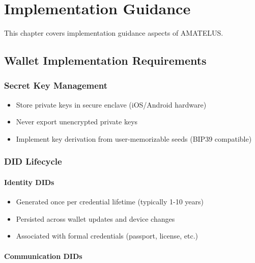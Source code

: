 \chapter{Implementation Guidance}


\begin{definition}
  \label{def:impl-chapter}
  This chapter covers implementation guidance aspects of AMATELUS.
  \leanok
\end{definition}
\section{Wallet Implementation Requirements}

\subsection{Secret Key Management}

\begin{itemize}
  \item Store private keys in secure enclave (iOS/Android hardware)
  \item Never export unencrypted private keys
  \item Implement key derivation from user-memorizable seeds (BIP39 compatible)
\end{itemize}

\subsection{DID Lifecycle}

\subsubsection{Identity DIDs}

\begin{itemize}
  \item Generated once per credential lifetime (typically 1-10 years)
  \item Persisted across wallet updates and device changes
  \item Associated with formal credentials (passport, license, etc.)
\end{itemize}

\subsubsection{Communication DIDs}

